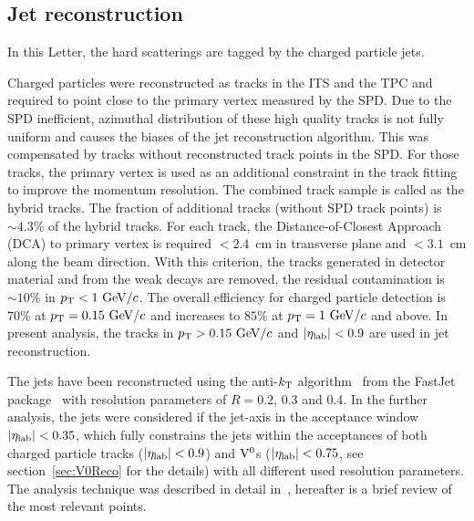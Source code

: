 \subsection{Jet reconstruction}
\label{sec:JetReco}

In this Letter, the hard scatterings are tagged by the charged particle jets.

Charged particles were reconstructed as tracks in the ITS and the TPC and required to point close to the primary vertex measured by the SPD.
Due to the SPD inefficient, azimuthal distribution of these high quality tracks is not fully uniform and causes the biases of the jet reconstruction algorithm.
This was compensated by tracks without reconstructed track points in the SPD.
For those tracks, the primary vertex is used as an additional constraint in the track fitting to improve the momentum resolution.
The combined track sample is called as the hybrid tracks.
The fraction of additional tracks (without SPD track points) is $\sim 4.3\%$ of the hybrid tracks.
For each track, the Distance-of-Closest Approach (DCA) to primary vertex is required $<2.4$~cm in transverse plane and $<3.1$~cm along the beam direction.
With this criterion, the tracks generated in detector material and from the weak decays are removed, the residual contamination is $\sim 10\%$ in $\pT<1~\GeVc$.
The overall efficiency for charged particle detection is $70\%$ at $\pT=0.15~\GeVc$ and increases to $85\%$ at $\pT=1~\GeVc$ and above.
In present analysis, the tracks in $\pT>0.15~\GeVc$ and $\left|\eta_{\rm lab}\right|<0.9$ are used in jet reconstruction. 

The jets have been reconstructed using the anti-$k_{\rm T}$ algorithm~\cite{Cacciari:2008gp} from the FastJet package~\cite{Cacciari:2011ma,Cacciari:2005hq} with resolution parameters of $R=0.2$, $0.3$ and $0.4$. In the further analysis, the jets were considered if the jet-axis in the acceptance window $\left|\eta_{\rm lab}\right|<0.35$, which fully constrains the jets within the acceptances of both charged particle tracks ($\left|\eta_{\rm lab}\right|<0.9$) and ${\rm V}^{0}$s ($\left|\eta_{\rm lab}\right|<0.75$, see section~\ref{sec:V0Reco} for the details) with all different used resolution parameters.
The analysis technique was described in detail in~\cite{Adam:2015hoa,Abelev:2013kqa}, hereafter is a brief review of the most relevant points.


